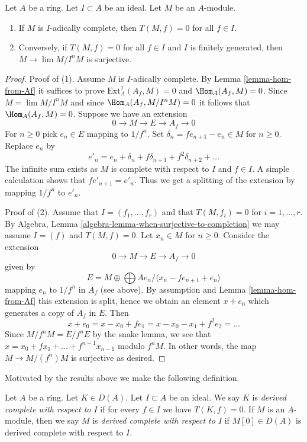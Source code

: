 \begin{lemma}
\label{lemma-complete-derived-complete}
Let $A$ be a ring. Let $I \subset A$ be an ideal. Let $M$ be an $A$-module.
\begin{enumerate}
\item If $M$ is $I$-adically complete, then $T(M, f) = 0$ for all $f \in I$.
\item Conversely, if $T(M, f) = 0$ for all $f \in I$ and $I$ is finitely
generated, then $M \to \lim M/I^nM$ is surjective.
\end{enumerate}
\end{lemma}

\begin{proof}
Proof of (1). Assume $M$ is $I$-adically complete.
By Lemma \ref{lemma-hom-from-Af} it suffices to prove
$\text{Ext}^1_A(A_f, M) = 0$ and $\Hom_A(A_f, M) = 0$.
Since $M = \lim M/I^nM$ and since $\Hom_A(A_f, M/I^nM) = 0$
it follows that $\Hom_A(A_f, M) = 0$. Suppose we have an extension
$$
0 \to M \to E \to A_f \to 0
$$
For $n \geq 0$ pick $e_n \in E$ mapping to $1/f^n$.
Set $\delta_n = fe_{n + 1} - e_n \in M$ for $n \geq 0$.
Replace $e_n$ by
$$
e'_n = e_n + \delta_n + f\delta_{n + 1} + f^2 \delta_{n + 2} + \ldots
$$
The infinite sum exists as $M$ is complete with respect to $I$ and $f \in I$.
A simple calculation shows that $fe'_{n + 1} = e'_n$. Thus we get a splitting
of the extension by mapping $1/f^n$ to $e'_n$.

\medskip\noindent
Proof of (2). Assume that $I = (f_1, \ldots, f_r)$ and that $T(M, f_i) = 0$
for $i = 1, \ldots, r$. By
Algebra, Lemma \ref{algebra-lemma-when-surjective-to-completion}
we may assume $I = (f)$ and $T(M, f) = 0$. Let $x_n \in M$ for $n \geq 0$.
Consider the extension
$$
0 \to M \to E \to A_f \to 0
$$
given by
$$
E = M \oplus \bigoplus Ae_n\Big/\langle x_n - fe_{n + 1} + e_n\rangle
$$
mapping $e_n$ to $1/f^n$ in $A_f$ (see above).
By assumption and Lemma \ref{lemma-hom-from-Af}
this extension is split, hence we obtain an element
$x + e_0$ which generates a copy of $A_f$ in $E$.
Then
$$
x + e_0 = x - x_0 + fe_1 = x - x_0 - x_1 + f^2 e_2 = \ldots
$$
Since $M/f^nM = E/f^nE$ by the snake lemma, we see that
$x = x_0 + fx_1 + \ldots + f^{n - 1}x_{n - 1}$ modulo $f^nM$.
In other words, the map $M \to M/(f^n)M$ is surjective as desired.
\end{proof}

\noindent
Motivated by the results above we make the following definition.

\begin{definition}
\label{definition-derived-complete}
Let $A$ be a ring. Let $K \in D(A)$. Let $I \subset A$ be an ideal.
We say $K$ is {\it derived complete with respect to $I$}
if for every $f \in I$ we have $T(K, f) = 0$.
If $M$ is an $A$-module, then we say $M$ is
{\it derived complete with respect to $I$}
if $M[0] \in D(A)$ is derived complete with respect to $I$.
\end{definition}

